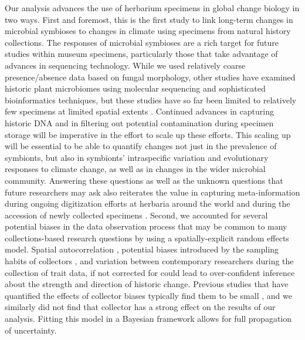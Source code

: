 \documentclass[11pt]{article}
\let\cite\citep
\begin{document}
Our analysis advances the use of herbarium specimens in global change biology in two ways. 
First and foremost, this is the first study to link long-term changes in microbial symbioses to changes in climate using specimens from natural history collections.
The responses of microbial symbioses are a rich target for future studies within museum specimens, particularly those that take advantage of advances in sequencing technology.
While we used relatively coarse presence/absence data based on fungal morphology, other studies have examined historic plant microbiomes using molecular sequencing and sophisticated bioinformatics techniques, but these studies have so far been limited to relatively few specimens at limited spatial extents \cite{yoshida2015computational, heberling2019utilizing, bieker2020metagenomic, gross2021hidden, bradshaw2021global}. 
Continued advances in capturing historic DNA and in filtering out potential contamination during specimen storage \citep{daru2019novel, bakker2020herbarium, raxworthy2021mining} will be imperative in the effort to scale up these efforts. 
This scaling up will be essential to be able to quantify changes not just in the prevalence of symbionts, but also in symbionts' intraspecific variation and evolutionary responses to climate change, as well as  in changes in the wider microbial community. 
Answering these questions as well as the unknown questions that future researchers may ask also reiterates the value in capturing meta-information during ongoing digitization efforts at herbaria around the world and during the accession of newly collected specimens \citep{lendemer2020extended}.
Second, we accounted for several potential biases in the data observation process that may be common to many collections-based research questions by using a spatially-explicit random effects model. 
Spatial autocorrelation \cite{willems2022forest}, potential biases introduced by the sampling habits of collectors \citep{daru2018widespread}, and variation between contemporary researchers during the collection of trait data, if not corrected for could lead to over-confident inference about the strength and direction of historic change.
Previous studies that have quantified the effects of collector biases typically find them to be small  \cite{davis2015herbarium,meineke2019herbarium}, and we similarly did not find that collector has a strong effect on the results of our analysis.
Fitting this model in a Bayesian framework allows for full propagation of uncertainty.
\end{document}
